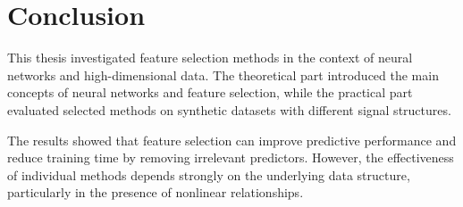 \chapter*{Conclusion}

This thesis investigated feature selection methods in the context of neural networks and high-dimensional data. The theoretical part introduced the main concepts of neural networks and feature selection, while the practical part evaluated selected methods on synthetic datasets with different signal structures.

The results showed that feature selection can improve predictive performance and reduce training time by removing irrelevant predictors. However, the effectiveness of individual methods depends strongly on the underlying data structure, particularly in the presence of nonlinear relationships.


